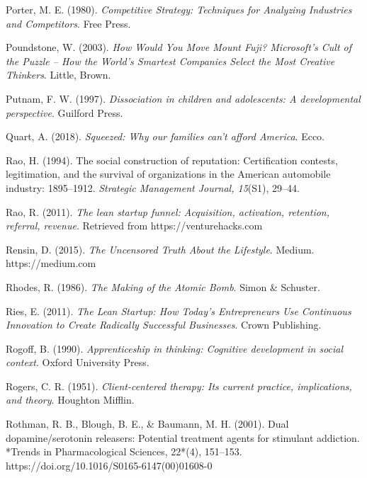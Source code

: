 \begin{thebibliography}{}
    Porter, M. E. (1980). \textit{Competitive Strategy: Techniques for Analyzing Industries and Competitors}. Free Press.

    Poundstone, W. (2003). \textit{How Would You Move Mount Fuji? Microsoft's Cult of the Puzzle -- How the World's Smartest Companies Select the Most Creative Thinkers}. Little, Brown.

    Putnam, F. W. (1997). \textit{Dissociation in children and adolescents: A developmental perspective}. Guilford Press.


    Quart, A. (2018). \textit{Squeezed: Why our families can't afford America}. Ecco.


    Rao, H. (1994). The social construction of reputation: Certification contests, legitimation, and the survival of organizations in the American automobile industry: 1895–1912. \textit{Strategic Management Journal, 15}(S1), 29–44.

    Rao, R. (2011). \textit{The lean startup funnel: Acquisition, activation, retention, referral, revenue}. Retrieved from https://venturehacks.com

    Rensin, D. (2015). \textit{The Uncensored Truth About the Lifestyle}. Medium. https://medium.com

    Rhodes, R. (1986). \textit{The Making of the Atomic Bomb}. Simon \& Schuster.

    Ries, E. (2011). \textit{The Lean Startup: How Today’s Entrepreneurs Use Continuous Innovation to Create Radically Successful Businesses}. Crown Publishing.
    
    Rogoff, B. (1990). \textit{Apprenticeship in thinking: Cognitive development in social context}. Oxford University Press.

    Rogers, C. R. (1951). \textit{Client-centered therapy: Its current practice, implications, and theory}. Houghton Mifflin.

    Rothman, R. B., Blough, B. E., \& Baumann, M. H. (2001). Dual dopamine/serotonin releasers: Potential treatment agents for stimulant addiction. *Trends in Pharmacological Sciences, 22*(4), 151–153. https://doi.org/10.1016/S0165-6147(00)01608-0


\end{thebibliography}
